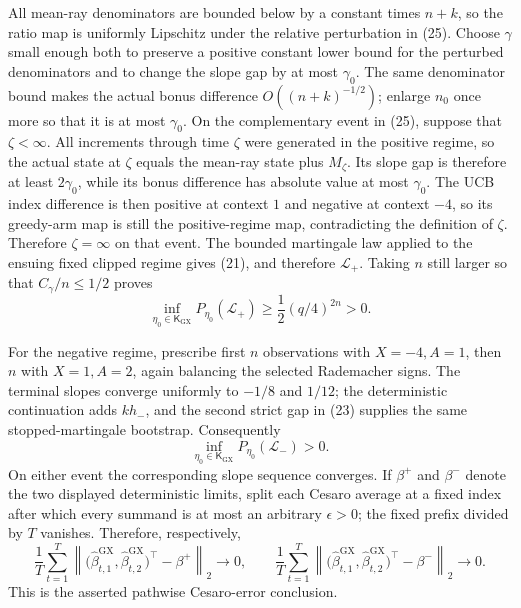 All mean-ray denominators are bounded below by a constant times \(n+k\), so the ratio map is uniformly Lipschitz under the relative perturbation in (25).  Choose \(\gamma\) small enough both to preserve a positive constant lower bound for the perturbed denominators and to change the slope gap by at most \(\gamma_0\).  The same denominator bound makes the actual bonus difference \(O((n+k)^{-1/2})\); enlarge \(n_0\) once more so that it is at most \(\gamma_0\).  On the complementary event in (25), suppose that \(\zeta<\infty\).  All increments through time \(\zeta\) were generated in the positive regime, so the actual state at \(\zeta\) equals the mean-ray state plus \(M_\zeta\).  Its slope gap is therefore at least \(2\gamma_0\), while its bonus difference has absolute value at most \(\gamma_0\).  The UCB index difference is then positive at context \(1\) and negative at context \(-4\), so its greedy-arm map is still the positive-regime map, contradicting the definition of \(\zeta\).  Therefore \(\zeta=\infty\) on that event.  The bounded martingale law applied to the ensuing fixed clipped regime gives (21), and therefore \(\mathcal L_+\).  Taking \(n\) still larger so that \(C_\gamma/n\leq1/2\) proves
\[
 \inf_{\eta_0\in\mathsf K_{\mathrm{GX}}}P_{\eta_0}(\mathcal L_+)
 \geq \frac12(q/4)^{2n}>0. \tag{26}
\]

For the negative regime, prescribe first \(n\) observations with \(X=-4,A=1\), then \(n\) with \(X=1,A=2\), again balancing the selected Rademacher signs.  The terminal slopes converge uniformly to \(-1/8\) and \(1/12\); the deterministic continuation adds \(kh_-\), and the second strict gap in (23) supplies the same stopped-martingale bootstrap.  Consequently
\[
 \inf_{\eta_0\in\mathsf K_{\mathrm{GX}}}P_{\eta_0}(\mathcal L_-)>0. \tag{27}
\]
On either event the corresponding slope sequence converges.  If \(\beta^+\) and \(\beta^-\) denote the two displayed deterministic limits, split each Cesaro average at a fixed index after which every summand is at most an arbitrary \(\epsilon>0\); the fixed prefix divided by \(T\) vanishes.  Therefore, respectively,
\[
 \frac1T\sum_{t=1}^T\left\|\bigl(\widehat\beta^{\mathrm{GX}}_{t,1},\widehat\beta^{\mathrm{GX}}_{t,2}\bigr)^\top-\beta^+\right\|_2\longrightarrow0,
 \qquad
 \frac1T\sum_{t=1}^T\left\|\bigl(\widehat\beta^{\mathrm{GX}}_{t,1},\widehat\beta^{\mathrm{GX}}_{t,2}\bigr)^\top-\beta^-\right\|_2\longrightarrow0.
\]
This is the asserted pathwise Cesaro-error conclusion.

